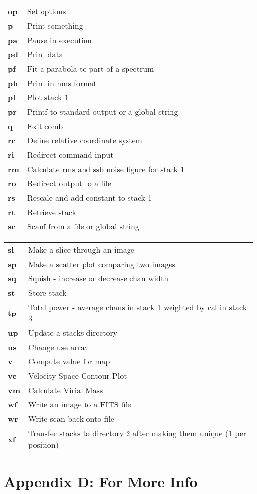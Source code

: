 \begin{tabular}{ll}
{\bf op} & Set options\\
{\bf p}  & Print something\\
{\bf pa} & Pause in execution\\
{\bf pd} & Print data\\
{\bf pf} & Fit a parabola to part of a spectrum\\
{\bf ph} & Print in hms format\\
{\bf pl} & Plot stack 1\\
{\bf pr} & Printf to standard output or a global string\\
{\bf q}  & Exit comb\\
{\bf rc} & Define relative coordinate system\\
{\bf ri} & Redirect command input\\
{\bf rm} & Calculate rms and ssb noise figure for stack 1\\
{\bf ro} & Redirect output to a file\\
{\bf rs} & Rescale and add constant to stack 1\\
{\bf rt} & Retrieve stack\\
{\bf sc} & Scanf from a file or global string\\
\end{tabular}
\newpage
\begin{tabular}{ll}
{\bf sl} & Make a slice through an image\\
{\bf sp} & Make a scatter plot comparing two images\\
{\bf sq} & Squish - increase or decrease chan width\\
{\bf st} & Store stack\\
{\bf tp} & Total power - average chans in stack 1 weighted by cal in stack 3\\
{\bf up} & Update a stacks directory\\
{\bf us} & Change use array\\
{\bf v}  & Compute value for map\\
{\bf vc} & Velocity Space Contour Plot\\
{\bf vm} & Calculate Virial Mass\\
{\bf wf} & Write an image to a FITS file\\
{\bf wr} & Write scan back onto file\\
{\bf xf} & Transfer stacks to directory 2 after making them unique (1 per position)\\
\end{tabular}
\newpage
\section*{Appendix D: For More Info} 

